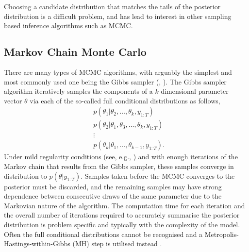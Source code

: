\documentclass[
12pt, %
onehalfspacing, %
nohyperref, %
headsepline, %
chapterinoneline, %
]{MastersDoctoralThesis} %
\begin{document}
Choosing a candidate distribution that matches the tails of the posterior distribution is a difficult problem, and has lead to interest in other sampling based inference algorithms such as MCMC.

\subsection{Markov Chain Monte Carlo}
\label{subsec:MCMC}

There are many types of MCMC algorithms, with arguably the simplest and most commonly used one being the Gibbs sampler (\cite{Geman1984}, \cite{Gilks1995a}). The Gibbs sampler algorithm iteratively samples the components of a $k$-dimensional parameter vector $\theta$ via each of the so-called full conditional distributions as follows,
\begin{align}
&p(\theta_{1} | \theta_{2}, \ldots, \theta_{k}, y_{1:T}) \nonumber \\
&p(\theta_{2} | \theta_{1}, \theta_{3}, \ldots, \theta_{k}, y_{1:T}) \nonumber \\
&\vdots \nonumber \\
&p(\theta_{k} | \theta_{1}, \ldots, \theta_{k-1}, y_{1:T}). \nonumber
\end{align}
Under mild regularity conditions (see, e.g., \citet{Tierney1994}) and with enough iterations of the Markov chain that results from the Gibbs sampler, these samples converge in distribution to $p(\theta | y_{1:T})$. Samples taken before the MCMC converges to the posterior must be discarded, and the remaining samples may have strong dependence between consecutive draws of the same parameter due to the Markovian nature of the algorithm. The computation time for each iteration and the overall number of iterations required to accurately summarise the posterior distribution is problem specific and typically with the complexity of the model. Often the full conditional distributions cannot be recognised and a Metropolis-Hastings-within-Gibbs (MH) step is utilised instead \citep{Gilks1995b}.
\\
\end{document}

